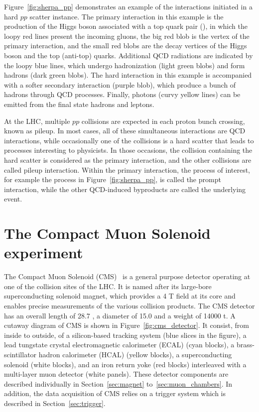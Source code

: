 Figure~\ref{fig:sherpa_pp} demonstrates an example of the interactions initiated in a hard $pp$ scatter instance.
The primary interaction in this example is the production of the Higgs boson associated with a top quark pair (\ttH),
in which the loopy red lines present the incoming gluons, the big red blob is the vertex of the primary interaction,
and the small red blobs are the decay vertices of the Higgs boson and the top (anti-top) quarks.
Additional QCD radiations are indicated by the loopy blue lines, which undergo hadronization (light green blobs) and form hadrons (dark green blobs). 
The hard interaction in this example is accompanied with a softer secondary interaction (purple blob), 
which produce a bunch of hadrons through QCD processes.
Finally, photons (curvy yellow lines) can be emitted from the final state hadrons and leptons.

At the LHC, multiple $pp$ collisions are expected in each proton bunch crossing, known as pileup.
In most cases, all of these simultaneous interactions are QCD interactions, 
while occasionally one of the collisions is a hard scatter that leads to processes interesting to physicists.
In those occasions, the collision containing the hard scatter is considered as the primary interaction, 
and the other collisions are called pileup interaction.
Within the primary interaction, the process of interest, for example the \ttH process in Figure~\ref{fig:sherpa_pp},
is called the prompt interaction, while the other QCD-induced byproducts are called the underlying event.

\section{The Compact Muon Solenoid experiment}\label{sec:cms}


The Compact Muon Solenoid (CMS)~\cite{Collaboration_2008} is a general purpose detector operating at one of the collision sites of the LHC.
It is named after its large-bore superconducting solenoid magnet, 
which provides a 4 T field at its core and enables precise measurements of the various collision products.
The CMS detector has an overall length of 28.7 \meter, a diameter of 15.0 \meter and a weight of 14000 t.
A cutaway diagram of CMS is shown in Figure~\ref{fig:cms_detector}.
It consist, from inside to outside, of a silicon-based tracking system (blue slices in the figure), 
a lead tungstate crystal electromagnetic calorimeter (ECAL) (cyan blocks),
a brass-scintillator hadron calorimeter (HCAL) (yellow blocks),
a superconducting solenoid (white blocks), 
and an iron return yoke (red blocks) interleaved with a multi-layer muon detector (white panels).
These detector components are described individually in Section~\ref{sec:magnet} to~\ref{sec:muon_chambers}.
In addition, the data acquisition of CMS relies on a trigger system which is described in Section~\ref{sec:trigger}.

